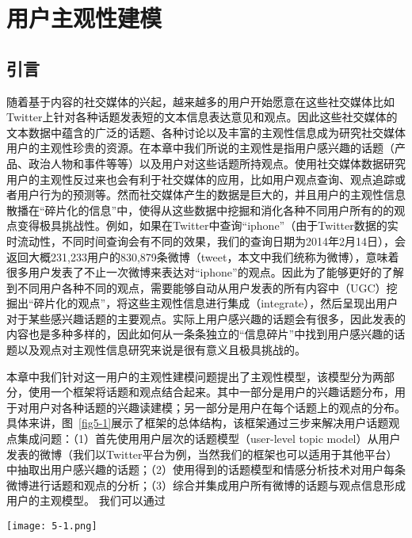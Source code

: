 \chapter{用户主观性建模}
\label{ch5}

\section{引言}
随着基于内容的社交媒体的兴起，越来越多的用户开始愿意在这些社交媒体比如Twitter上针对各种话题发表短的文本信息表达意见和观点。因此这些社交媒体的文本数据中蕴含的广泛的话题、各种讨论以及丰富的主观性信息成为研究社交媒体用户的主观性珍贵的资源。在本章中我们所说的主观性是指用户感兴趣的话题（产品、政治人物和事件等等）以及用户对这些话题所持观点。使用社交媒体数据研究用户的主观性反过来也会有利于社交媒体的应用，比如用户观点查询、观点追踪或者用户行为的预测等。然而社交媒体产生的数据是巨大的，并且用户的主观性信息散播在“碎片化的信息”中，使得从这些数据中挖掘和消化各种不同用户所有的的观点变得极具挑战性。例如，如果在Twitter中查询“iphone”（由于Twitter数据的实时流动性，不同时间查询会有不同的效果，我们的查询日期为2014年2月14日），会返回大概231,233用户的830,879条微博（tweet，本文中我们统称为微博），意味着很多用户发表了不止一次微博来表达对“iphone”的观点。因此为了能够更好的了解到不同用户各种不同的观点，需要能够自动从用户发表的所有内容中（UGC）挖掘出“碎片化的观点”，将这些主观性信息进行集成（integrate），然后呈现出用户对于某些感兴趣话题的主要观点。实际上用户感兴趣的话题会有很多，因此发表的内容也是多种多样的，因此如何从一条条独立的“信息碎片”中找到用户感兴趣的话题以及观点对主观性信息研究来说是很有意义且极具挑战的。

本章中我们针对这一用户的主观性建模问题提出了主观性模型，该模型分为两部分，使用一个框架将话题和观点结合起来。其中一部分是用户的兴趣话题分布，用于对用户对各种话题的兴趣读建模；另一部分是用户在每个话题上的观点的分布。具体来讲，图~\ref{fig5-1}展示了框架的总体结构，该框架通过三步来解决用户话题观点集成问题：（1）首先使用用户层次的话题模型（user-level topic model）从用户发表的微博（我们以Twitter平台为例，当然我们的框架也可以适用于其他平台）中抽取出用户感兴趣的话题；（2）使用得到的话题模型和情感分析技术对用户每条微博进行话题和观点的分析；（3）综合并集成用户所有微博的话题与观点信息形成用户的主观模型。
我们可以通过

\begin{landscape}
\begin{figure*}[htb]
\centering
\texttt{[image: 5-1.png]}
\caption{主观模型总体框架.}
\label{fig5-1}
\end{figure*}
\end{landscape}


